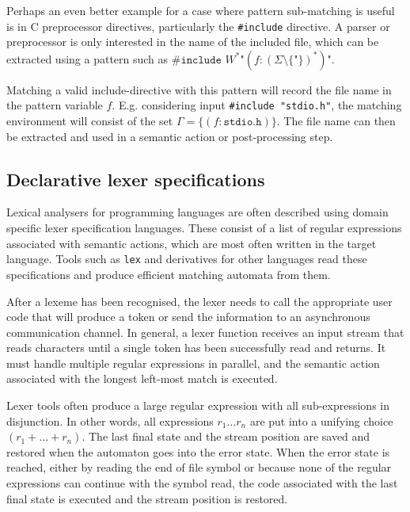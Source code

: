 Perhaps an even better example for a case where pattern sub-matching is useful
is in C preprocessor directives, particularly the \verb!#include! directive. A
parser or preprocessor is only interested in the name of the included file,
which can be extracted using a pattern such as $\texttt{\#include } W^*
\texttt{"} (f:(\Sigma \setminus \{\texttt{"}\})^*) \texttt{"}$.

Matching a valid include-directive with this pattern will record the file name
in the pattern variable $f$. E.g. considering input \verb!#include "stdio.h"!,
the matching environment will consist of the set $\Gamma = \{
(f:\texttt{stdio.h}) \}$. The file name can then be extracted and used in a
semantic action or post-processing step.

\subsection{Declarative lexer specifications}

Lexical analysers for programming languages are often described using domain
specific lexer specification languages. These consist of a list of regular
expressions associated with semantic actions, which are most often written in
the target language. Tools such as \texttt{lex} and derivatives for other
languages read these specifications and produce efficient matching automata from
them.

After a lexeme has been recognised, the lexer needs to call the appropriate user
code that will produce a token or send the information to an asynchronous
communication channel. In general, a lexer function receives an input stream
that reads characters until a single token has been successfully read and
returns. It must handle multiple regular expressions in parallel, and the
semantic action associated with the longest left-most match is executed.

Lexer tools often produce a large regular expression with all sub-expressions in
disjunction. In other words, all expressions $r_1 \dots r_n$ are put into a
unifying choice $(r_1 + \dots + r_n)$. The last final state and the stream
position are saved and restored when the automaton goes into the error state.
When the error state is reached, either by reading the end of file symbol or
because none of the regular expressions can continue with the symbol read, the
code associated with the last final state is executed and the stream position is
restored.

